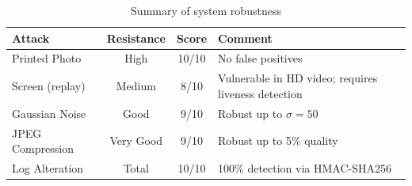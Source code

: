 \begin{table}[H]
    \centering
    \begin{tabularx}{\textwidth}{lccX}
        \toprule
        \textbf{Attack} & \textbf{Resistance} & \textbf{Score} & \textbf{Comment} \\
        \midrule
        Printed Photo      & High      & 10/10 & No false positives \\
        Screen (replay)    & Medium    & 8/10  & Vulnerable in HD video; requires liveness detection \\
        Gaussian Noise     & Good      & 9/10  & Robust up to $\sigma=50$ \\
        JPEG Compression   & Very Good & 9/10  & Robust up to 5\% quality \\
        Log Alteration     & Total     & 10/10 & 100\% detection via HMAC-SHA256 \\
        \bottomrule
    \end{tabularx}
    \caption{Summary of system robustness}
\end{table}
